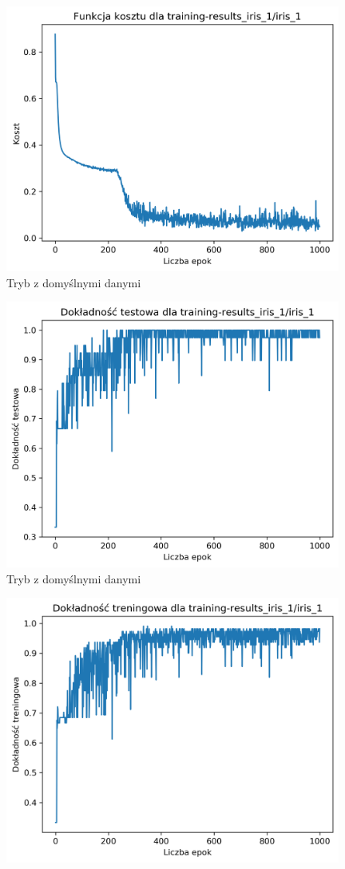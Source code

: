\documentclass{classrep}
\begin{document}
{{{                \begin{figure}[!htbp]
                    \centering
                    \includegraphics[width=110mm]{wykresy/iris_1_cost.png}
                    \caption{Tryb z domyślnymi danymi}
                \end{figure}
                \begin{figure}[!htbp]
                    \centering
                    \includegraphics[width=110mm]{wykresy/iris_1_testing-accuracy.png}
                    \caption{Tryb z domyślnymi danymi}
                \end{figure}
                \begin{figure}[!htbp]
                    \centering
                    \includegraphics[width=110mm]{wykresy/iris_1_training-accuracy.png}

\end{figure}}}}
\end{document}
